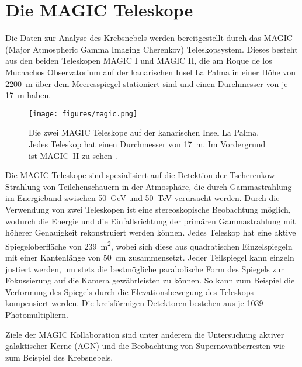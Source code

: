 \section{Die MAGIC Teleskope}
\label{sec:teleskop}

Die Daten zur Analyse des Krebsnebels werden bereitgestellt durch das MAGIC
(Major Atmospheric Gamma Imaging Cherenkov) Teleskopsystem. Dieses besteht aus
den beiden Teleskopen MAGIC I und MAGIC II, die am Roque de los Muchachos
Observatorium auf der kanarischen Insel La Palma in einer Höhe von
\SI{2200}{\metre} über dem Meeresspiegel stationiert sind und einen Durchmesser
von je \SI{17}{\metre} haben.

\begin{figure}
  \centering
  \texttt{[image: figures/magic.png]}
  \caption{Die zwei MAGIC Teleskope auf der kanarischen Insel La Palma. Jedes
  Teleskop hat einen Durchmesser von \SI{17}{\metre}. Im Vordergrund ist
  MAGIC~II zu sehen \cite{magic}.} %
  \label{fig:telescope}
\end{figure}

Die MAGIC Teleskope sind spezialisiert auf die Detektion der
Tscherenkow-Strahlung von Teilchenschauern in der Atmosphäre, die durch
Gammastrahlung im Energieband zwischen \SI{50}{\giga\electronvolt} und
\SI{50}{\tera\electronvolt} verursacht werden. Durch die Verwendung von zwei
Teleskopen ist eine stereoskopische Beobachtung möglich, wodurch die Energie und
die Einfallsrichtung der primären Gammastrahlung mit höherer Genauigkeit
rekonstruiert werden können. Jedes Teleskop hat eine aktive Spiegeloberfläche
von \SI{239}{\metre\squared}, wobei sich diese aus quadratischen Einzelspiegeln
mit einer Kantenlänge von \SI{50}{\centi\metre} zusammensetzt. Jeder Teilspiegel
kann einzeln justiert werden, um stets die bestmögliche parabolische Form des
Spiegels zur Fokussierung auf die Kamera gewährleisten zu können. So kann zum
Beispiel die Verformung des Spiegels durch die Elevationsbewegung des Teleskops
kompensiert werden. Die kreisförmigen Detektoren bestehen aus je 1039
Photomultipliern.

Ziele der MAGIC Kollaboration sind unter anderem die Untersuchung aktiver
galaktischer Kerne (AGN) und die Beobachtung von Supernovaüberresten wie zum
Beispiel des Krebsnebels.
